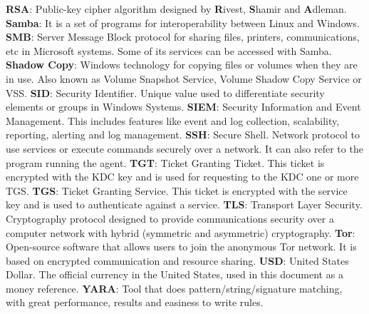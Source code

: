 \linej
\linej
\textbf{RSA}: Public-key cipher algorithm designed by \textbf{R}ivest, \textbf{S}hamir and \textbf{A}dleman.
\linej
\linej
\textbf{Samba}: It is a set of programs for interoperability between Linux and Windows.
\linej
\linej
\textbf{SMB}: Server Message Block protocol for sharing files, printers, communications, etc in Microsoft systems. Some of its services can be accessed with Samba.
\linej
\linej
\textbf{Shadow Copy}: Windows technology for copying files or volumes when they are in use. Also known as Volume Snapshot Service, Volume Shadow Copy Service or VSS.
\linej
\linej
\textbf{SID}: Security Identifier. Unique value used to differentiate security elements or groups in Windows Systems.
\linej
\linej
\textbf{SIEM}: Security Information and Event Management. This includes features like event and log collection, scalability, reporting, alerting and log management.
\linej
\linej
\textbf{SSH}: Secure Shell. Network protocol to use services or execute commands securely over a network. It can also refer to the program running the agent.
\linej
\linej
\textbf{TGT}: Ticket Granting Ticket. This ticket is encrypted with the KDC key and is used for requesting to the KDC one or more TGS.
\linej
\linej
\textbf{TGS}: Ticket Granting Service. This ticket is encrypted with the service key and is used to authenticate against a service.
\linej
\linej
\textbf{TLS}: Transport Layer Security. Cryptography protocol designed to provide communications security over a computer network with hybrid (symmetric and asymmetric) cryptography.
\linej
\linej
\textbf{Tor}: Open-source software that allows users to join the anonymous Tor network. It is based on encrypted communication and resource sharing.
\linej
\linej
\textbf{USD}: United States Dollar. The official currency in the United States, used in this document as a money reference.
\linej
\linej
\textbf{YARA}: Tool that does pattern/string/signature matching, with great performance, results and easiness to write rules.
\linej
\linej
